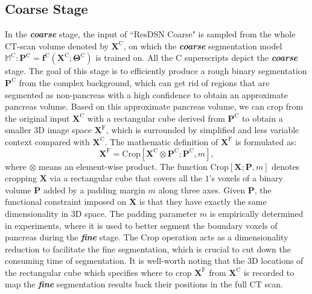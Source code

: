 \documentclass[10pt,twocolumn,letterpaper]{article}
\begin{document}
\subsection{Coarse Stage}\label{Sec:CoarseStage}
In the \textit{\textbf{coarse}} stage, the input of ``ResDSN Coarse" is sampled from the whole CT-scan volume denoted by $\mathbf{X}^\textrm{C}$, on which the \textit{\textbf{coarse}} segmentation model $\mathbb{M}^\textrm{C}: \mathbf{P}^\textrm{C} = {\mathbf{f}^\textrm{C}\!\left(\mathbf{X}^\textrm{C}; \boldsymbol{\Theta}^\textrm{C}\right)}$ is trained on. All the $\textrm{C}$ superscripts depict the \textit{\textbf{coarse}} stage. The goal of this stage is to efficiently produce a rough binary segmentation $\mathbf{P}^\textrm{C}$ from the complex background, which can get rid of regions that are segmented as non-pancreas with a high confidence to obtain an approximate pancreas volume. Based on this approximate pancreas volume, we can crop from the original input $\mathbf{X}^\textrm{C}$ with a rectangular cube derived from $\mathbf{P}^\textrm{C}$ to obtain a smaller 3D image space $\mathbf{X}^\textrm{F}$, which is surrounded by simplified and less variable context compared with $\mathbf{X}^\textrm{C}$. The mathematic definition of $\mathbf{X}^\textrm{F}$ is formulated as:
\begin{equation}\label{Eq:CoarseSegmentation}
\mathbf{X}^\textrm{F} = \textrm{Crop}[\mathbf{X}^\textrm{C}\otimes\mathbf{P}^\textrm{C}; \mathbf{P}^\textrm{C}, m],
\end{equation}
where $\otimes$ means an element-wise product. The function $\textrm{Crop}[\mathbf{X};\mathbf{P}, m]$ denotes cropping $\mathbf{X}$ via a rectangular cube that covers all the $1$'s voxels of a binary volume $\mathbf{P}$ added by a padding margin $m$ along three axes. Given $\mathbf{P}$, the functional constraint imposed on $\mathbf{X}$ is that they have exactly the same dimensionality in 3D space. The padding parameter $m$ is empirically determined in experiments, where it is used to better segment the boundary voxels of pancreas during the \textit{\textbf{fine}} stage. The $\textrm{Crop}$ operation acts as a dimensionality reduction to facilitate the fine segmentation, which is crucial to cut down the consuming time of segmentation. It is well-worth noting that the 3D locations of the rectangular cube which specifies where to crop $\mathbf{X}^\textrm{F}$ from $\mathbf{X}^\textrm{C}$ is recorded to map the \textit{\textbf{fine}} segmentation results back their positions in the full CT scan.
\end{document}
